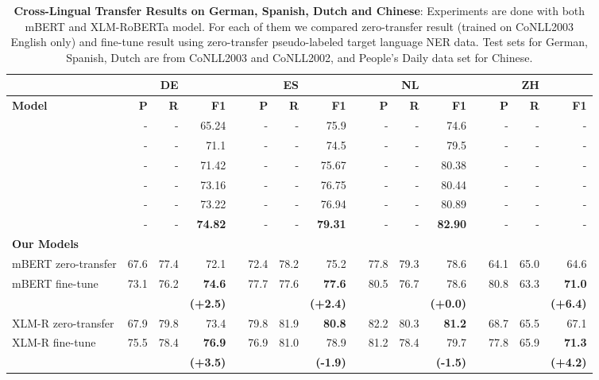 \documentclass[11pt]{article}
\begin{document}
\begin{table*}[t]
	\small
	\begin{center}
		\begin{tabular}{lrrrrrrrrrrrrrrr}
			\toprule
			&&\textbf{DE}&&&&\textbf{ES}&&&&\textbf{NL}&&&&\textbf{ZH}&\\
			\hline
			\textbf{Model} & \textbf{P} & \textbf{R} & \textbf{F1} && \textbf{P} & \textbf{R} & \textbf{ F1} && \textbf{P} & \textbf{R} & \textbf{ F1} && \textbf{P} & \textbf{R} & \textbf{F1}\\
			\hline
			\citet{bari2019zero}& - & - & 65.24 && - & - & 75.9 && - & - & 74.6 && - & - & - \\
			\citet{wu2019beto}& - & - & 71.1 && - & - & 74.5 && - & - & 79.5 && - & - & - \\
			\citet{moon2019lingua}& - & - & 71.42 && - & - & 75.67 && - & - & 80.38 && - & - & - \\
			\citet{wu2020enhanced}& - & - & 73.16 && - & - & 76.75 && - & - & 80.44 && - & - & -\\
			\citet{wu2020single}& - & - & 73.22 && - & - & 76.94 && - & - & 80.89 && - & - & -\\
			\citet{wu2020unitrans}& - & - & \textbf{74.82} && - & - & \textbf{79.31} && - & - & \textbf{82.90} && - & - & -\\
			\hline
			\textbf{Our Models}&  &  &  &&  & &  && &  &  && & &\\
			\hline
			mBERT zero-transfer & 67.6 & 77.4 & 72.1 && 72.4 &  78.2 & 75.2 && 77.8 & 79.3 & 78.6 && 64.1 & 65.0 & 64.6 \\
			mBERT fine-tune & 73.1 & 76.2 & \textbf{74.6} && 77.7 & 77.6 & \textbf{77.6} && 80.5 & 76.7 & 78.6 && 80.8 & 63.3 & \textbf{71.0} \\
			&  & & \textbf{\scriptsize{(+2.5)}} &&  & & \textbf{\scriptsize{(+2.4)}} &&  & & \textbf{\scriptsize{(+0.0)}} && & & \textbf{\scriptsize{(+6.4)}} \\
			\hline
			XLM-R zero-transfer & 67.9 & 79.8 & 73.4 && 79.8 & 81.9 & \textbf{80.8} && 82.2 & 80.3 & \textbf{81.2} && 68.7 & 65.5 & 67.1 \\
			XLM-R fine-tune & 75.5 & 78.4 & \textbf{76.9} && 76.9 & 81.0 & 78.9 && 81.2 & 78.4 & 79.7 && 77.8 & 65.9 & \textbf{71.3} \\
			&  & & \textbf{\scriptsize{(+3.5)}} &&  & & \textbf{\scriptsize{(-1.9)}} &&  & & \textbf{\scriptsize{(-1.5)}} && & & \textbf{\scriptsize{(+4.2)}} \\
			\toprule
		\end{tabular}
	\end{center}
	\caption{\textbf{Cross-Lingual Transfer Results on German, Spanish, Dutch and Chinese}: Experiments are done with both mBERT and XLM-RoBERTa model. For each of them we compared zero-transfer result (trained on CoNLL2003 English only) and fine-tune result using zero-transfer pseudo-labeled target language NER data. Test sets for German, Spanish, Dutch are from CoNLL2003 and CoNLL2002, and People's Daily data set for Chinese.}
	\label{tab:transferresults}
\end{table*}
\end{document}
